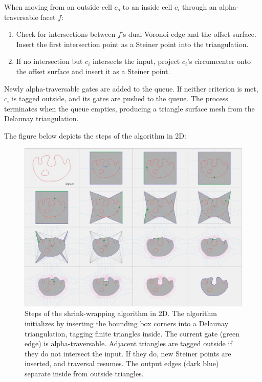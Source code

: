 \documentclass[12pt]{article}
\begin{document}
When moving from an outside cell \( c_o \) to an inside cell \( c_i \) through
an alpha-traversable facet \( f \):

\begin{enumerate}
    \item Check for intersections between \( f \)'s dual Voronoi edge and
    the offset surface. Insert the first intersection point as a Steiner point
    into the triangulation.
    \item If no intersection but \( c_i \) intersects the input, project
    \( c_i \)'s circumcenter onto the offset surface and insert it as a Steiner point.
\end{enumerate}

Newly alpha-traversable gates are added to the queue. If neither criterion is
met, \( c_i \) is tagged outside, and its gates are pushed to the queue. The
process terminates when the queue empties, producing a triangle surface mesh from
 the Delaunay triangulation.

The figure below depicts the steps of the algorithm in 2D:
\begin{figure}[H]
    \centering
        \centering
        \includegraphics[width=\textwidth]{images/aw3_steps.jpg}
        \caption{Steps of the shrink-wrapping algorithm in 2D. The algorithm
        initializes by inserting the bounding box corners into a Delaunay
        triangulation, tagging finite triangles inside. The current gate (green
        edge) is alpha-traversable. Adjacent triangles are tagged outside if
        they do not intersect the input. If they do, new Steiner points are
        inserted, and traversal resumes. The output edges (dark blue) separate
        inside from outside triangles.
        }
\end{figure}
\end{document}

